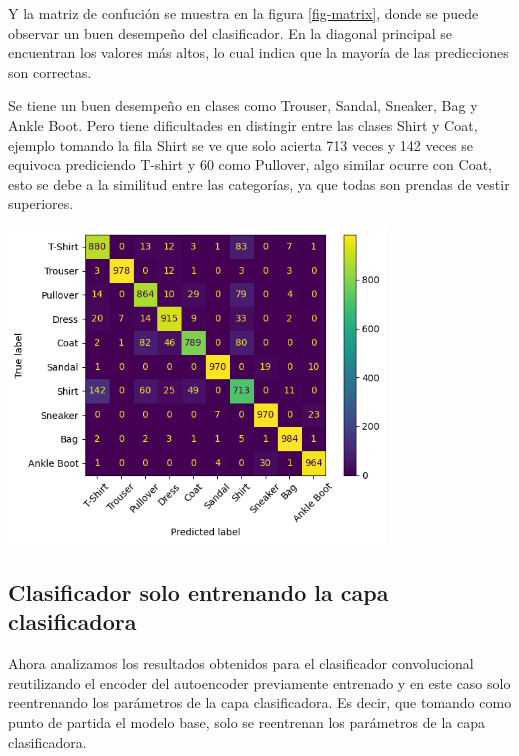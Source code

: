 \documentclass[aps,prl,reprint,groupedaddress]{revtex4-2}
\newenvironment{Figura}
  {\par\medskip\noindent\minipage{\linewidth}}
  {\endminipage\par\medskip}
\begin{document}
Y la matriz de confución se muestra en la figura \ref{fig-matrix}, donde se 
puede observar un buen desempeño del clasificador. En la diagonal principal se
encuentran los valores más altos, lo cual indica que la mayoría de las
predicciones son correctas. 

Se tiene un buen desempeño en clases como Trouser, Sandal, Sneaker, Bag y Ankle
Boot. Pero tiene dificultades en distingir entre las clases Shirt y Coat, 
ejemplo tomando la fila Shirt se ve que solo acierta 713 veces y 142 veces se 
equivoca prediciendo T-shirt y 60 como Pullover, algo similar ocurre con Coat, 
esto se debe a la similitud entre las categorías, ya que todas son prendas de 
vestir superiores.
\begin{Figura}
  \centering
  \includegraphics[width=0.75\textwidth]{figs1/matrix_confuncion_modelo_con_clasificador.png}
  \label{fig-matrix}
\end{Figura}

\subsection{Clasificador solo entrenando la capa clasificadora}

Ahora analizamos los resultados obtenidos para el clasificador convolucional
reutilizando el encoder del autoencoder previamente entrenado y en este caso
solo reentrenando los parámetros de la capa clasificadora. Es decir, que 
tomando como punto de partida el modelo base, solo se reentrenan los parámetros
de la capa clasificadora.
\end{document}
